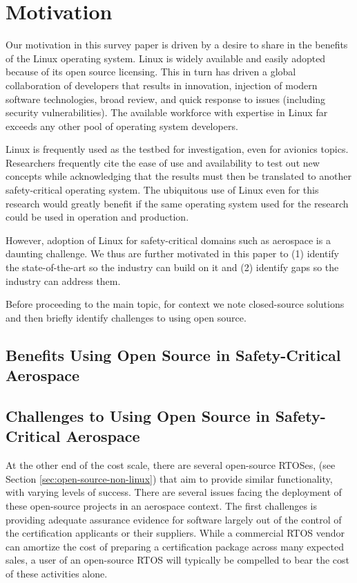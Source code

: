 \section{Motivation}
\label{sec:motivation}

Our motivation in this survey paper is driven by a desire to share in the benefits of the Linux operating system. Linux is widely available and easily adopted because of its open source licensing. This in turn has driven a global collaboration of developers that results in innovation, injection of modern software technologies, broad review, and quick response to issues (including security vulnerabilities). The available workforce with expertise in Linux far exceeds any other pool of operating system developers.

Linux is frequently used as the testbed for investigation, even for avionics topics. Researchers frequently cite the ease of use and availability to test out new concepts while acknowledging that the results must then be translated to another safety-critical operating system. The ubiquitous use of Linux even for this research would greatly benefit if the same operating system used for the research could be used in operation and production.

However, adoption of Linux for safety-critical domains such as aerospace is a daunting challenge. We thus are further motivated in this paper to (1) identify the state-of-the-art so the industry can build on it and (2) identify gaps so the industry can address them.

Before proceeding to the main topic, for context we note closed-source solutions and then briefly identify challenges to using open source.

\subsection{Benefits Using Open Source in Safety-Critical Aerospace}

\subsection{Challenges to Using Open Source in Safety-Critical Aerospace}

At the other end of the cost scale, there are several open-source RTOSes, (see Section \ref{sec:open-source-non-linux}) that aim to provide similar functionality, with varying levels of success. There are several issues facing the deployment of these open-source projects in an aerospace context. The first challenges is providing adequate assurance evidence for software largely out of the control of the certification applicants or their suppliers. While a commercial RTOS vendor can amortize the cost of preparing a certification package across many expected sales, a user of an open-source RTOS will typically be compelled to bear the cost of these activities alone.

